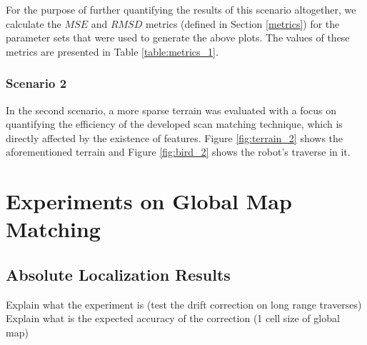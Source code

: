 For the purpose of further quantifying the results of this scenario altogether,
we calculate the $MSE$ and $RMSD$ metrics (defined in Section \ref{metrics})
for the parameter sets that were used to generate the above plots.
The values of these metrics are presented in Table \ref{table:metrics_1}.


\subsubsection{Scenario 2}

In the second scenario, a more sparse terrain was evaluated with a focus on
quantifying the efficiency of the developed scan matching technique, which
is directly affected by the existence of features.
Figure \ref{fig:terrain_2} shows the aforementioned terrain and
Figure \ref{fig:bird_2} shows the robot's traverse in it.


\section{Experiments on Global Map Matching}

\subsection{Absolute Localization Results}

Explain what the experiment is (test the drift correction on long range traverses)\\
Explain what is the expected accuracy of the correction (1 cell size of global map)





